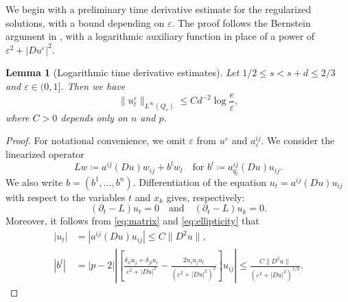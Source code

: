 \documentclass[a4paper,11pt]{amsart}
\theoremstyle{plain}
\newtheorem{lemma}[theorem]{Lemma}
\theoremstyle{definition}
\numberwithin{equation}{section}
\begin{document}
We begin with a preliminary time derivative estimate for the regularized solutions, with a bound depending on $\varepsilon$. The proof follows the Bernstein argument in \cite{LLYZ25}, with a logarithmic auxiliary function in place of a power of $\varepsilon^2+|Du^\varepsilon|^2$.

\begin{lemma}[Logarithmic time derivative estimates]\label{lem:logarithmic}
Let $1/2\leq s<s+d\leq2/3$ and $\varepsilon \in (0,1]$. Then we have
\begin{equation}\label{eq:logarithmic}
 \|u_t^\varepsilon\|_{L^\infty(Q_s)}
 \leq Cd^{-2}\log\frac e\varepsilon,
\end{equation}
where $C>0$ depends only on $n$ and $p$.
\end{lemma}

\begin{proof}
For notational convenience, we omit $\varepsilon$ from $u^\varepsilon$ and $a_\varepsilon^{ij}$. We consider the linearized operator
\begin{equation*}
 Lw\coloneqq a^{ij}(Du)w_{ij}+b^l w_l \quad \text{for $b^l\coloneqq a^{ij}_{q_l}(Du)u_{ij}$}.
\end{equation*}
We also write $b=(b^1, \ldots, b^n)$. Differentiation of the equation $u_t=a^{ij}(Du)u_{ij}$ with respect to the variables $t$ and $x_k$ gives, respectively:
\begin{equation}\label{eq:linearized}
 (\partial_t-L)u_t=0
 \quad \text{and} \quad
 (\partial_t-L)u_k=0.
\end{equation}
Moreover, it follows from \eqref{eq:matrix} and \eqref{eq:ellipticity} that
\begin{equation}\label{eq:drift}
    \begin{aligned}
    |u_t|&=|a^{ij}(Du)u_{ij}|\leq C\|D^2u\|,\\
    |b^l|&=|p-2|\left|\left[\frac{\delta_{il}u_j+\delta_{jl}u_i}{\varepsilon^2+|Du|^2}-\frac{2u_iu_ju_l}{(\varepsilon^2+|Du|^2)^2}\right] u_{ij} \right|\leq\frac{C\|D^2u\|}{(\varepsilon^2+|Du|^2)^{1/2}}.
    \end{aligned}
\end{equation}


\end{proof}
\end{document}
